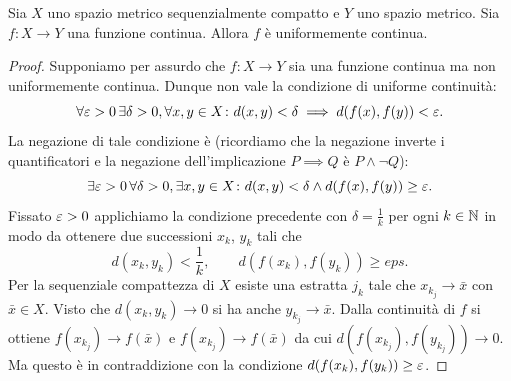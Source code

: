 \begin{theorem}
  \label{th:HeineCantor}
Sia $X$ uno spazio metrico sequenzialmente compatto e $Y$ uno spazio metrico.
Sia $f\colon X\to Y$ una funzione continua. 
Allora $f$ è uniformemente continua.
\end{theorem}
%
\begin{proof}
Supponiamo per assurdo che $f\colon X\to Y$ sia una funzione continua 
ma non uniformemente continua. Dunque non vale la condizione di uniforme
continuità:
\[
 \forall \varepsilon>0\, \exists \delta>0, \forall x,y\in X\colon 
  d(x,y)<\delta \implies d(f(x),f(y))< \varepsilon. 
\]
La negazione di tale condizione è 
(ricordiamo che la negazione inverte i quantificatori 
e la negazione dell'implicazione $P\implies Q$ è $P\land \lnot Q$):
\[
 \exists \varepsilon>0\, \forall \delta>0, \exists x,y\in X\colon
 d(x,y)<\delta \land d(f(x),f(y))\ge \varepsilon.
\]
Fissato $\varepsilon>0$ applichiamo la condizione precedente 
con $\delta = \frac 1 k$ per ogni $k\in {\mathbb N}$ in modo da ottenere 
due successioni $x_k$, $y_k$ tali che
\[
  d(x_k,y_k)< \frac 1 k, \qquad d(f(x_k),f(y_k))\ge eps.
\]
Per la sequenziale compattezza di $X$ esiste una estratta $j_k$ 
tale che $x_{k_j}\to \bar x$ con $\bar x\in X$.
Visto che $d(x_k,y_k)\to 0$ si ha anche $y_{k_j}\to \bar x$.
Dalla continuità di $f$ si ottiene $f(x_{k_j})\to f(\bar x)$ 
e $f(x_{k_j})\to f(\bar x)$ da cui $d(f(x_{k_j}),f(y_{k_j}))\to 0$.
Ma questo è in contraddizione con la condizione $d(f(x_k),f(y_k))\ge \varepsilon$.
\end{proof}
  
